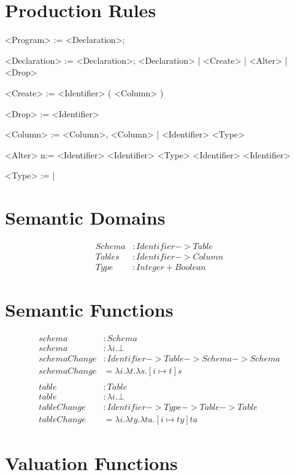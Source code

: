 \documentclass[12pt]{article}
\begin{document}
\section{Production Rules}
\begin{grammar}
  <Program> := <Declaration>;

  <Declaration> := <Declaration>; <Declaration> | <Create> | <Alter> | <Drop>

  <Create> :=  <Identifier> ( <Column> )

  <Drop> :=  <Identifier>

  <Column> := <Column>, <Column> | <Identifier> <Type>

  <Alter> n:=  <Identifier>  <Identifier> <Type>
           \alt {} <Identifier>  <Identifier>

  <Type> :=  | 
\end{grammar}

\section{Semantic Domains}
\begin{align*}
  Schema &: Identifier -> Table \\
  Tables &: Identifier -> Column \\
  Type &: Integer + Boolean
\end{align*}

\section{Semantic Functions}
\begin{align*}
  schema &: Schema \\
  schema &: \lambda i.\bot \\
  schemaChange &: Identifier -> Table -> Schema -> Schema \\
  schemaChange &= \lambda i. \lambda t. \lambda s. [ i \mapsto t ]s \\
  \\
  table &: Table \\
  table &: \lambda i.\bot \\
  tableChange &: Identifier -> Type -> Table -> Table \\
  tableChange &= \lambda i. \lambda ty. \lambda ta. [ i \mapsto ty ]ta
\end{align*}

\section{Valuation Functions}
\end{document}
